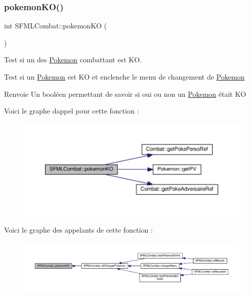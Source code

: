 \subsubsection{\texorpdfstring{pokemon\+K\+O()}{pokemonKO()}}
{\footnotesize\ttfamily int S\+F\+M\+L\+Combat\+::pokemon\+KO (\begin{DoxyParamCaption}{ }\end{DoxyParamCaption})\hspace{0.3cm}{\ttfamily [private]}}



Test si un des \hyperlink{class_pokemon}{Pokemon} combattant est KO. 

Test si un \hyperlink{class_pokemon}{Pokemon} est KO et enclenche le menu de changement de \hyperlink{class_pokemon}{Pokemon} \begin{DoxyReturn}{Renvoie}
Un booléen permettant de savoir si oui ou non un \hyperlink{class_pokemon}{Pokemon} était KO 
\end{DoxyReturn}
Voici le graphe d\textquotesingle{}appel pour cette fonction \+:\nopagebreak
\begin{figure}[H]
\begin{center}
\leavevmode
\includegraphics[width=350pt]{class_s_f_m_l_combat_a2665ce99eeccb4bdb1e032086a9feb04_cgraph}
\end{center}
\end{figure}
Voici le graphe des appelants de cette fonction \+:\nopagebreak
\begin{figure}[H]
\begin{center}
\leavevmode
\includegraphics[width=350pt]{class_s_f_m_l_combat_a2665ce99eeccb4bdb1e032086a9feb04_icgraph}
\end{center}
\end{figure}
\mbox{\label{class_s_f_m_l_combat_a796b43eec3296bc9d66e2618069f5abe}} 
